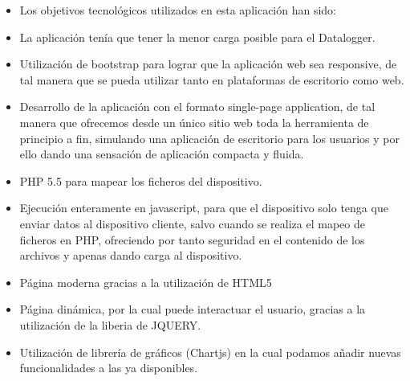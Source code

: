 \begin{itemize}

\item Los objetivos tecnológicos utilizados en esta aplicación han sido:

\item La aplicación tenía que tener la menor carga posible para el Datalogger.

\item Utilización de bootstrap\cite{Bootstrap} para lograr que la aplicación web sea responsive, de tal manera que se pueda utilizar tanto en plataformas de escritorio como web.


\item Desarrollo de la aplicación con el formato single-page application, de tal manera que ofrecemos desde un único sitio web toda la herramienta de principio a fin\cite{SPA}, simulando una aplicación de escritorio para los usuarios y por ello dando una sensación de aplicación compacta y fluida.
\item PHP 5.5 para mapear los ficheros del dispositivo.

\item Ejecución enteramente en javascript, para que el dispositivo solo tenga que enviar datos al dispositivo cliente, salvo cuando se realiza el mapeo de ficheros en PHP, ofreciendo por tanto seguridad en el contenido de los archivos y apenas dando carga al dispositivo.
\item Página moderna gracias a la utilización de HTML5
\item Página dinámica, por la cual puede interactuar el usuario, gracias a la utilización de la liberia de JQUERY.

\item Utilización de librería de gráficos (Chartjs) en la cual podamos añadir nuevas funcionalidades a las ya disponibles.


\end{itemize}